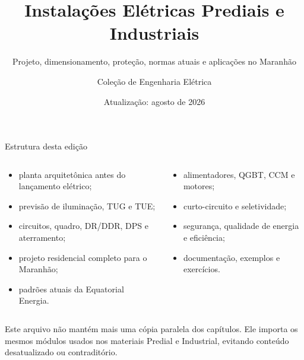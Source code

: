 \documentclass[11pt,aspectratio=169]{beamer}
\title{Instalações Elétricas Prediais e Industriais}
\subtitle{Projeto, dimensionamento, proteção, normas atuais e aplicações no Maranhão}
\author{Coleção de Engenharia Elétrica}
\institute{Material 03 — versão combinada modular}
\date{Atualização: agosto de 2026}
\begin{document}
{
\begin{frame}
  \titlepage
\end{frame}}

\begin{frame}{Estrutura desta edição}
\small
\begin{columns}[T,onlytextwidth]
\begin{caixaNorma}[title=Predial]
\begin{itemize}
\item planta arquitetônica antes do lançamento elétrico;
\item previsão de iluminação, TUG e TUE;
\item circuitos, quadro, DR/DDR, DPS e aterramento;
\item projeto residencial completo para o Maranhão;
\item padrões atuais da Equatorial Energia.
\end{itemize}
\end{caixaNorma}
\begin{caixaProjeto}[title=Industrial]
\begin{itemize}
\item alimentadores, QGBT, CCM e motores;
\item curto-circuito e seletividade;
\item segurança, qualidade de energia e eficiência;
\item documentação, exemplos e exercícios.
\end{itemize}
\end{caixaProjeto}
\end{columns}
\vspace{1mm}
\begin{caixaObs}
Este arquivo não mantém mais uma cópia paralela dos capítulos. Ele importa os mesmos módulos usados nos materiais Predial e Industrial, evitando conteúdo desatualizado ou contraditório.
\end{caixaObs}
\end{frame}









\end{document}
